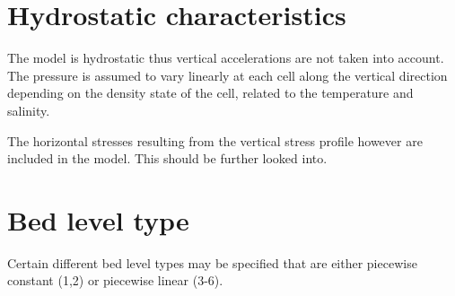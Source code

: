 \section{Hydrostatic characteristics}\label{hydrostatic-characteristics}

The model is hydrostatic thus vertical accelerations are not taken into
account. The pressure is assumed to vary linearly at each cell along the
vertical direction depending on the density state of the cell, related
to the temperature and salinity. \citep[p.121]{DFlowTechMan}

The horizontal stresses resulting from the vertical stress profile
however are included in the model. This should be further looked into.

\section{Bed level type}\label{bed-level-type}

Certain different bed level types may be specified that are either
piecewise constant (1,2) or piecewise linear (3-6).

